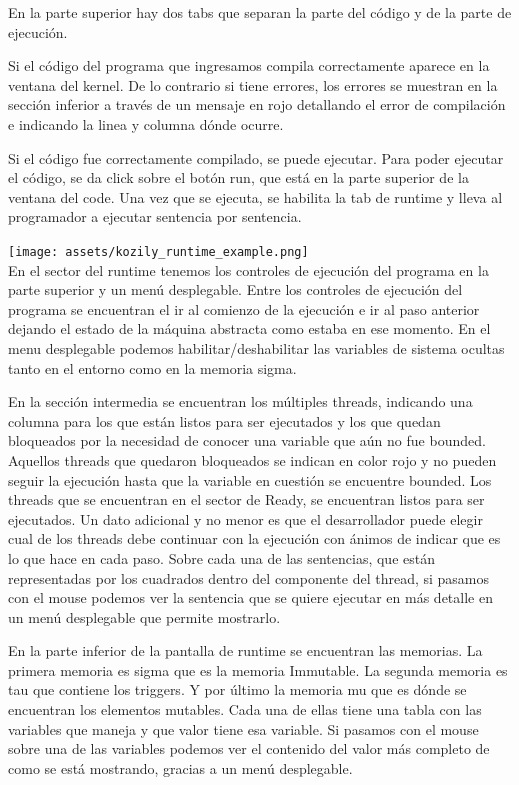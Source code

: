 \documentclass[a4paper,11pt]{article}
\begin{document}
En la parte superior hay dos tabs que separan la parte del código y de la parte de ejecución.

Si el código del programa que ingresamos compila correctamente aparece en la ventana del kernel. De lo contrario si tiene errores, los errores se muestran en la sección inferior a través de un mensaje en rojo detallando el error de compilación e indicando la linea y columna dónde ocurre.

Si el código fue correctamente compilado, se puede ejecutar.
Para poder ejecutar el código, se da click sobre el botón run, que está en la parte superior de la ventana del code.
Una vez que se ejecuta, se habilita la tab de runtime y lleva al programador a ejecutar sentencia por sentencia.

\texttt{[image: assets/kozily\_runtime\_example.png]}\\[1cm]

En el sector del runtime tenemos los controles de ejecución del programa en la parte superior y un menú desplegable. Entre los controles de ejecución del programa se encuentran el ir al comienzo de la ejecución e ir al paso anterior dejando el estado de la máquina abstracta como estaba en ese momento. En el menu desplegable podemos habilitar/deshabilitar las variables de sistema ocultas tanto en el entorno como en la memoria sigma.

En la sección intermedia se encuentran los múltiples threads, indicando una columna para los que están listos para ser ejecutados y los que quedan bloqueados por la necesidad de conocer una variable que aún no fue bounded. Aquellos threads que quedaron bloqueados se indican en color rojo y no pueden seguir la ejecución hasta que la variable en cuestión se encuentre bounded.
Los threads que se encuentran en el sector de Ready, se encuentran listos para ser ejecutados.
Un dato adicional y no menor es que el desarrollador puede elegir cual de los threads debe continuar con la ejecución con ánimos de indicar que es lo que hace en cada paso.
Sobre cada una de las sentencias, que están representadas por los cuadrados dentro del componente del thread, si pasamos con el mouse podemos ver la sentencia que se quiere ejecutar en más detalle en un menú desplegable que permite mostrarlo.

En la parte inferior de la pantalla de runtime se encuentran las memorias. La primera memoria es sigma que es la memoria Immutable. La segunda memoria es tau que contiene los triggers. Y por último la memoria mu que es dónde se encuentran los elementos mutables. Cada una de ellas tiene una tabla con las variables que maneja y que valor tiene esa variable. Si pasamos con el mouse sobre una de las variables podemos ver el contenido del valor más completo de como se está mostrando, gracias a un menú desplegable.
\end{document}
